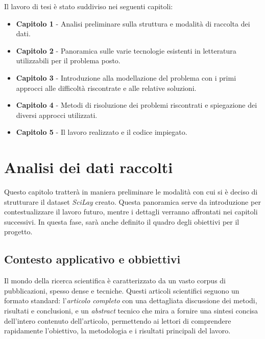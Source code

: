 \documentclass[12pt,a4paper,twoside,openright]{book}
\begin{document}
Il lavoro di tesi è stato suddiviso nei seguenti capitoli:

\begin{itemize}
    \item \textbf{Capitolo 1} - Analisi preliminare sulla struttura e modalità di raccolta dei dati.
    \item \textbf{Capitolo 2} - Panoramica sulle varie tecnologie esistenti in letteratura utilizzabili per il problema posto.
    \item \textbf{Capitolo 3} - Introduzione alla modellazione del problema con i primi approcci alle difficoltà riscontrate e alle relative soluzioni.
    \item \textbf{Capitolo 4} - Metodi di risoluzione dei problemi riscontrati e spiegazione dei diversi approcci utilizzati.
    \item \textbf{Capitolo 5} - Il lavoro realizzato e il codice impiegato.
\end{itemize}

\newpage

\tableofcontents

\newpage

\listoffigures

\mainmatter

\pagestyle{fancy} 
\fancyhead[LO]{\nouppercase{\rightmark}}
\fancyhead[RE]{\nouppercase{\leftmark}}
\fancyhead[LE,RO]{\thepage}
\fancyfoot{}



\chapter{Analisi dei dati raccolti}

Questo capitolo tratterà in maniera preliminare le modalità con cui si è deciso di strutturare il dataset \emph{SciLay} creato. Questa panoramica serve da introduzione per contestualizzare il lavoro futuro, mentre i dettagli verranno affrontati nei capitoli successivi. In questa fase, sarà anche definito il quadro degli obiettivi per il progetto.

\section{Contesto applicativo e obbiettivi}


Il mondo della ricerca scientifica è caratterizzato da un vasto corpus di pubblicazioni, spesso dense e tecniche. Questi articoli scientifici seguono un formato standard: l'\emph{articolo completo} con una dettagliata discussione dei metodi, risultati e conclusioni, e un \emph{abstract} tecnico che mira a fornire una sintesi concisa dell'intero contenuto dell'articolo, permettendo ai lettori di comprendere rapidamente l'obiettivo, la metodologia e i risultati principali del lavoro.
\end{document}
